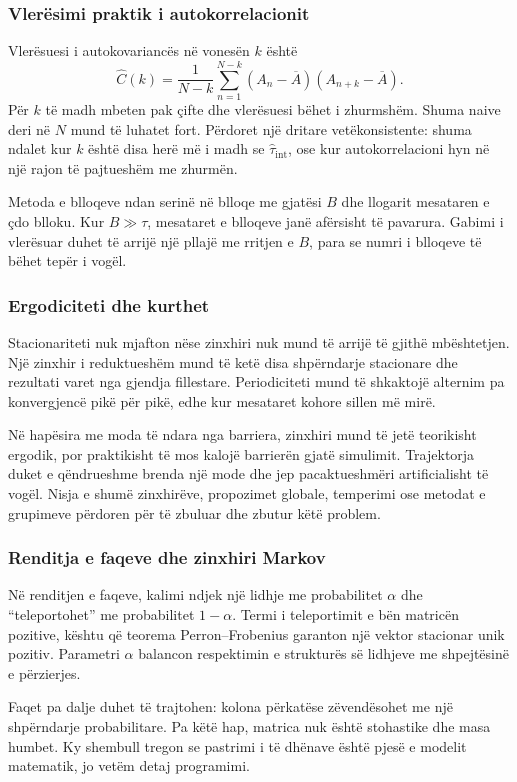 \subsubsection{Vlerësimi praktik i autokorrelacionit}
Vlerësuesi i autokovariancës në vonesën $k$ është
\begin{equation}
 \widehat C(k)=\frac{1}{N-k}\sum_{n=1}^{N-k}
 (A_n-\overline A)(A_{n+k}-\overline A).
\end{equation}
Për $k$ të madh mbeten pak çifte dhe vlerësuesi bëhet i zhurmshëm. Shuma naive deri në $N$ mund të luhatet fort. Përdoret një dritare vetëkonsistente: shuma ndalet kur $k$ është disa herë më i madh se $\widehat\tau_{\mathrm{int}}$, ose kur autokorrelacioni hyn në një rajon të pajtueshëm me zhurmën.

Metoda e blloqeve ndan serinë në blloqe me gjatësi $B$ dhe llogarit mesataren e çdo blloku. Kur $B\gg\tau$, mesataret e blloqeve janë afërsisht të pavarura. Gabimi i vlerësuar duhet të arrijë një pllajë me rritjen e $B$, para se numri i blloqeve të bëhet tepër i vogël.

\subsubsection{Ergodiciteti dhe kurthet}
Stacionariteti nuk mjafton nëse zinxhiri nuk mund të arrijë të gjithë mbështetjen. Një zinxhir i reduktueshëm mund të ketë disa shpërndarje stacionare dhe rezultati varet nga gjendja fillestare. Periodiciteti mund të shkaktojë alternim pa konvergjencë pikë për pikë, edhe kur mesataret kohore sillen më mirë.

Në hapësira me moda të ndara nga barriera, zinxhiri mund të jetë teorikisht ergodik, por praktikisht të mos kalojë barrierën gjatë simulimit. Trajektorja duket e qëndrueshme brenda një mode dhe jep pacaktueshmëri artificialisht të vogël. Nisja e shumë zinxhirëve, propozimet globale, temperimi ose metodat e grupimeve përdoren për të zbuluar dhe zbutur këtë problem.

\subsubsection{Renditja e faqeve dhe zinxhiri Markov}
Në renditjen e faqeve, kalimi ndjek një lidhje me probabilitet $\alpha$ dhe ``teleportohet'' me probabilitet $1-\alpha$. Termi i teleportimit e bën matricën pozitive, kështu që teorema Perron--Frobenius garanton një vektor stacionar unik pozitiv. Parametri $\alpha$ balancon respektimin e strukturës së lidhjeve me shpejtësinë e përzierjes.

Faqet pa dalje duhet të trajtohen: kolona përkatëse zëvendësohet me një shpërndarje probabilitare. Pa këtë hap, matrica nuk është stohastike dhe masa humbet. Ky shembull tregon se pastrimi i të dhënave është pjesë e modelit matematik, jo vetëm detaj programimi.
